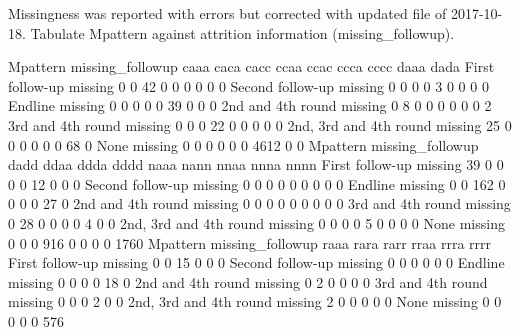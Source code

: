 
Missingness was reported with errors but corrected with updated file of 2017-10-18. Tabulate \textsf{Mpattern} against attrition information (\textsf{missing\_followup}).
\begin{Schunk}
\begin{Soutput}
                                Mpattern
missing_followup                 caaa caca cacc ccaa ccac ccca cccc daaa dada
  First follow-up missing           0    0   42    0    0    0    0    0    0
  Second follow-up missing          0    0    0    0    3    0    0    0    0
  Endline missing                   0    0    0    0    0   39    0    0    0
  2nd and 4th round missing         0    8    0    0    0    0    0    0    2
  3rd and 4th round missing         0    0    0   22    0    0    0    0    0
  2nd, 3rd and 4th round missing   25    0    0    0    0    0    0   68    0
  None missing                      0    0    0    0    0    0 4612    0    0
                                Mpattern
missing_followup                 dadd ddaa ddda dddd naaa nann nnaa nnna nnnn
  First follow-up missing          39    0    0    0    0   12    0    0    0
  Second follow-up missing          0    0    0    0    0    0    0    0    0
  Endline missing                   0    0  162    0    0    0    0   27    0
  2nd and 4th round missing         0    0    0    0    0    0    0    0    0
  3rd and 4th round missing         0   28    0    0    0    0    4    0    0
  2nd, 3rd and 4th round missing    0    0    0    0    5    0    0    0    0
  None missing                      0    0    0  916    0    0    0    0 1760
                                Mpattern
missing_followup                 raaa rara rarr rraa rrra rrrr
  First follow-up missing           0    0   15    0    0    0
  Second follow-up missing          0    0    0    0    0    0
  Endline missing                   0    0    0    0   18    0
  2nd and 4th round missing         0    2    0    0    0    0
  3rd and 4th round missing         0    0    0    2    0    0
  2nd, 3rd and 4th round missing    2    0    0    0    0    0
  None missing                      0    0    0    0    0  576
\end{Soutput}
\end{Schunk}


